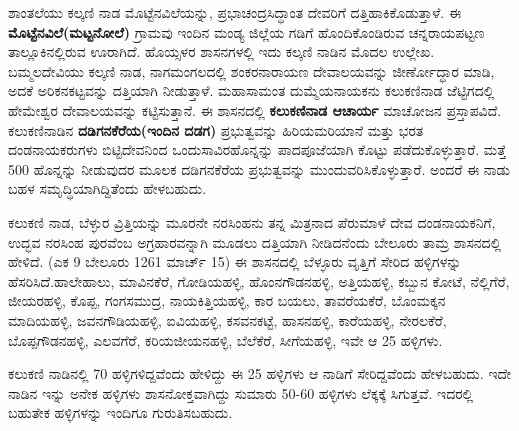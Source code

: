 \vskip -2pt

ಶಾಂತಲೆಯು ಕಲ್ಕಣಿ ನಾಡ ಮೊಟ್ಟೆನವಿಲೆಯನ್ನು, ಪ್ರಭಾಚಂದ್ರಸಿದ್ಧಾಂತ ದೇವರಿಗೆ ದತ್ತಿಹಾಕಿಕೊಡುತ್ತಾಳೆ. ಈ \textbf{ಮೊಟ್ಟೆನವಿಲೆ(ಮಟ್ಟನೋಲೆ)} ಗ್ರಾಮವು ಇಂದಿನ ಮಂಡ್ಯ ಜಿಲ್ಲೆಯ ಗಡಿಗೆ ಹೊಂದಿಕೊಂಡಿರುವ ಚನ್ನರಾಯಪಟ್ಟಣ ತಾಲ್ಲೂಕಿನಲ್ಲಿರುವ ಊರಾಗಿದೆ. ಹೊಯ್ಸಳರ ಶಾಸನಗಳಲ್ಲಿ ಇದು ಕಲ್ಕಣಿ ನಾಡಿನ ಮೊದಲ ಉಲ್ಲೇಖ. ಬಮ್ಮಲದೇವಿಯು ಕಲ್ಕಣಿ ನಾಡ, ನಾಗಮಂಗಲದಲ್ಲಿ ಶಂಕರನಾರಾಯಣ ದೇವಾಲಯವನ್ನು ಜೀರ್ಣೋದ್ಧಾರ ಮಾಡಿ, ಅದಕೆ ಅರಿಕನಕಟ್ಟವನ್ನು ದತ್ತಿಯಾಗಿ ನೀಡುತ್ತಾಳೆ. ಮಹಾಸಾಮಂತ ದುಮ್ಮೆಯನಾಯಕನು ಕಲುಕಣಿನಾಡ ಜೆಟ್ಟಿಗದಲ್ಲಿ ಹೇಮೇಶ್ವರ ದೇವಾಲಯವನ್ನು ಕಟ್ಟಿಸುತ್ತಾನೆ. ಈ ಶಾಸನದಲ್ಲಿ \textbf{ಕಲುಕಣಿನಾಡ ಆಚಾರ್ಯ} ಮಾಚೋಜನ ಪ್ರಸ್ತಾಪವಿದೆ. ಕಲುಕಣಿನಾಡಿನ \textbf{ದಡಿಗನಕೆರೆಯ\general{\break }(ಇಂದಿನ ದಡಗ)} ಪ್ರಭುತ್ವವನ್ನು ಹಿರಿಯಮರಿಯಾನೆ ಮತ್ತು ಭರತ ದಂಡನಾಯಕರುಗಳು ಬಿಟ್ಟಿದೇವನಿಂದ ಒಂದುಸಾವಿರ\-ಹೊನ್ನನ್ನು ಪಾದಪೂಜೆಯಾಗಿ ಕೊಟ್ಟು ಪಡೆದುಕೊಳ್ಳುತ್ತಾರೆ. ಮತ್ತೆ 500 ಹೊನ್ನನ್ನು ನೀಡುವುದರ ಮೂಲಕ ದಡಿಗನಕೆರೆಯ ಪ್ರಭುತ್ವವನ್ನು ಮುಂದುವರಿಸಿಕೊಳ್ಳುತ್ತಾರೆ. ಅಂದರೆ ಈ ನಾಡು ಬಹಳ ಸಮೃದ್ಧಿಯಾಗಿದ್ದಿತೆಂದು ಹೇಳಬಹುದು.

\vskip -2pt

ಕಲುಕಣಿ ನಾಡ, ಬೆಳ್ಳುರ ವ್ರಿತ್ತಿಯನ್ನು ಮೂರನೇ ನರಸಿಂಹನು ತನ್ನ ಮಿತ್ರನಾದ ಪೆರುಮಾಳೆ ದೇವ ದಂಡನಾಯಕನಿಗೆ, ಉದ್ಭವ ನರಸಿಂಹ ಪುರವೆಂಬ ಅಗ್ರಹಾರವನ್ನಾಗಿ ಮೂಡಲು ದತ್ತಿಯಾಗಿ ನೀಡಿದನೆಂದು ಬೇಲೂರು ತಾಮ್ರ ಶಾಸನದಲ್ಲಿ ಹೇಳಿದೆ. (ಎಕ 9 ಬೇಲೂರು 1261 ಮಾರ್ಚ್ 15) ಈ ಶಾಸನದಲ್ಲಿ ಬೆಳ್ಳೂರು ವೃತ್ತಿಗೆ ಸೇರಿದ ಹಳ್ಳಿಗಳನ್ನು ಹೆಸರಿಸಿದೆ.\break ಹಾಲೇಹಾಲು, ಮಾವಿನಕೆರೆ, ಗೋಡಿಯಹಳ್ಳಿ, ಹೊಂನಗೌಡನಹಳ್ಳಿ, ಅತ್ತಿಯಹಳ್ಳಿ, ಕಬ್ಬುನ ಕೋಟೆ, ನೆಲ್ಲಿಗೆರೆ, ಜೀಯರಹಳ್ಳಿ, ಕೊಪ್ಪ, ಗಂಗಸಮುದ್ರ, ನಾಯಕಿತ್ತಿಯಹಳ್ಳಿ, ಕಾರ ಬಯಲು, ತಾವರೆಯಕೆರೆ, ಬೊಂಮಕ್ಕನ ಮಾದಿಯಹಳ್ಳಿ, ಜವನಗೌಡಿಯಹಳ್ಳಿ, ಐವಿಯಹಳ್ಳಿ, ಕಸವನಕಟ್ಟೆ, ಹಾಸನಹಳ್ಳಿ, ಕಾರೆಯಹಳ್ಳಿ, ನೇರಲಕೆರೆ, ಬೊಪ್ಪಗೌಡನಹಳ್ಳಿ, ಎಲವಗೆರೆ, ಕರಿಯಜೀಯನಹಳ್ಳಿ, ಬೆಲೆಕೆರೆ, ಸೀಗೆಯಹಳ್ಳಿ, ಇವೇ ಆ 25 ಹಳ್ಳಿಗಳು.

\vskip -2pt

ಕಲುಕಣಿ ನಾಡಿನಲ್ಲಿ 70 ಹಳ್ಳಿಗಳಿದ್ದವೆಂದು ಹೇಳಿದ್ದು ಈ 25 ಹಳ್ಳಿಗಳು ಆ ನಾಡಿಗೆ ಸೇರಿದ್ದವೆಂದು ಹೇಳಬಹುದು. ಇದೇ ನಾಡಿನ ಇನ್ನು ಅನೇಕ ಹಳ್ಳಿಗಳು ಶಾಸನೋಕ್ತವಾಗಿದ್ದು ಸುಮಾರು 50-60 ಹಳ್ಳಿಗಳು ಲೆಕ್ಕಕ್ಕೆ ಸಿಗುತ್ತವೆ. ಇದರಲ್ಲಿ ಬಹುತೇಕ ಹಳ್ಳಿಗಳನ್ನು ಇಂದಿಗೂ ಗುರುತಿಸಬಹುದು.

\vskip -2pt


